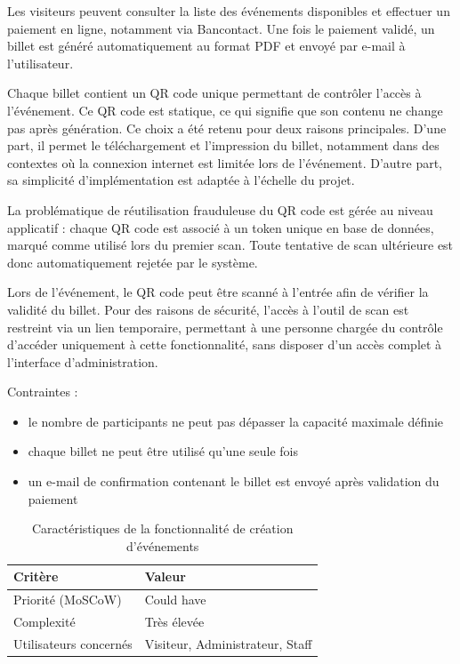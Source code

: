 \documentclass{article}
\begin{document}
Les visiteurs peuvent consulter la liste des événements 
disponibles et effectuer un paiement en ligne, notamment via 
Bancontact. Une fois le paiement validé, un billet est généré 
automatiquement au format PDF et envoyé par e-mail à l'utilisateur.

Chaque billet contient un QR code unique permettant de contrôler 
l'accès à l'événement. Ce QR code est statique, ce qui signifie 
que son contenu ne change pas après génération. Ce choix a été 
retenu pour deux raisons principales. D'une part, il permet le 
téléchargement et l'impression du billet, notamment dans des 
contextes où la connexion internet est limitée lors de l'événement. 
D'autre part, sa simplicité d'implémentation est adaptée à 
l'échelle du projet.

La problématique de réutilisation frauduleuse du QR code est 
gérée au niveau applicatif : chaque QR code est associé à un 
token unique en base de données, marqué comme utilisé lors du 
premier scan. Toute tentative de scan ultérieure est donc 
automatiquement rejetée par le système.

Lors de l'événement, le QR code peut être scanné à l'entrée 
afin de vérifier la validité du billet. Pour des raisons de 
sécurité, l'accès à l'outil de scan est restreint via un lien 
temporaire, permettant à une personne chargée du contrôle 
d'accéder uniquement à cette fonctionnalité, sans disposer 
d'un accès complet à l'interface d'administration.

Contraintes :
\begin{itemize}
    \item le nombre de participants ne peut pas dépasser 
    la capacité maximale définie
    \item chaque billet ne peut être utilisé qu'une seule fois
    \item un e-mail de confirmation contenant le billet est 
    envoyé après validation du paiement
\end{itemize}

\begin{table}[H]
\centering
\begin{tabular}{|p{5cm}|p{7cm}|}
\hline
\textbf{Critère} & \textbf{Valeur} \\
\hline
Priorité (MoSCoW) & Could have \\
\hline
Complexité & Très élevée \\
\hline
Utilisateurs concernés & Visiteur, Administrateur, Staff \\
\hline
\end{tabular}
\caption{Caractéristiques de la fonctionnalité de création d'événements}
\end{table}
\end{document}
